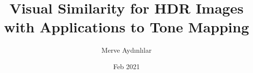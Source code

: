\documentclass[chaparabic,ceng,phd,12pt,oneandhalf,fivejury]{metu}
\author{Merve Aydınlılar}
\title{Visual Similarity for HDR Images with Applications to Tone Mapping}
\date{Feb 2021}
\begin{document}
\begin{preliminaries}


\end{preliminaries}
%   
% 
%

\setlength{\parindent}{0em}
\setlength{\parskip}{10pt}










%
%

%

% 
\end{document}
